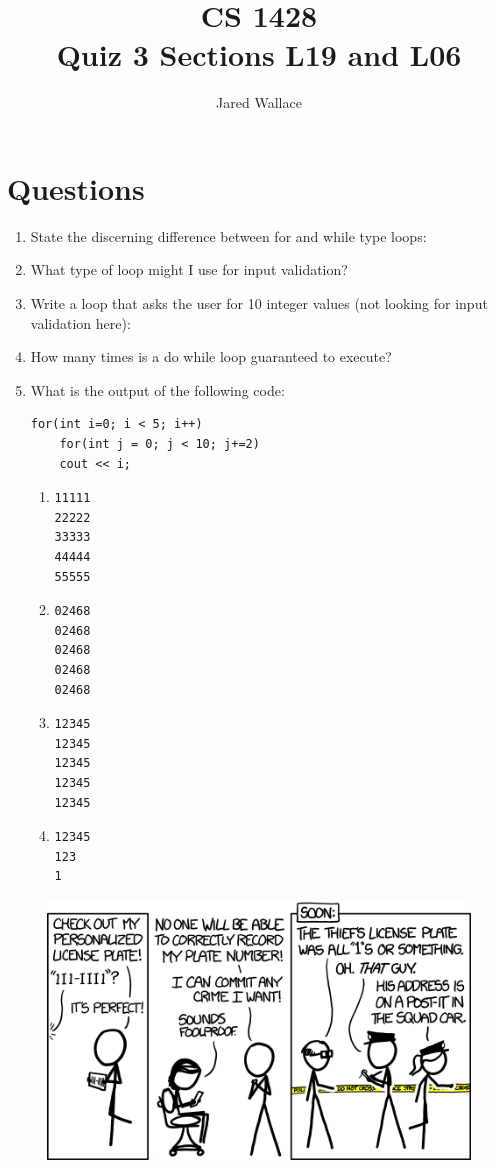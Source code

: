 \documentclass[letterpaper,12pt]{article}
\title{\Large CS 1428\\Quiz 3 Sections L19 and L06}
\author{Jared Wallace}
\date{}
\begin{document}
\maketitle

\section*{Questions}
\begin{enumerate}
	\item State the discerning difference between for and while type loops:
		\vspace{20mm}
	\item What type of loop might I use for input validation?
		\vspace{20mm}
	\item Write a loop that asks the user for 10 integer values (not looking for input validation here):
		\vspace{20mm}
	\item How many times is a do while loop guaranteed to execute?
		\vspace{20mm}
	\newpage
	\item What is the output of the following code:
	\begin{lstlisting}
for(int i=0; i < 5; i++)
	for(int j = 0; j < 10; j+=2)
	cout << i;
	\end{lstlisting}

\begin{multicols}{2}
	\begin{enumerate}
		\item
			\begin{lstlisting}
11111
22222
33333
44444
55555
			\end{lstlisting}
		\item
			\begin{lstlisting}
02468
02468
02468
02468
02468
			\end{lstlisting}
		\item
			\begin{lstlisting}
12345
12345
12345
12345
12345
			\end{lstlisting}
		\item
			\begin{lstlisting}
12345
123
1
			\end{lstlisting}
		\end{enumerate}
	\end{multicols}
	
\end{enumerate}

\vspace{20mm}

\begin{figure}[ht!]
	\centering
	\includegraphics[width=5in]{license_plate.png}
\end{figure}
\end{document}
